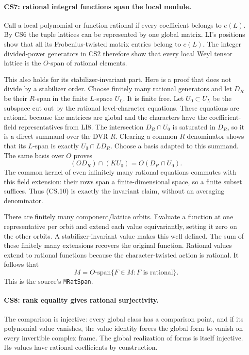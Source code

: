 \paragraph{CS7: rational integral functions span the local module.}
Call a local polynomial or function rational if every coefficient
belongs to $e(L)$. By CS6 the tuple lattices can be represented by one
global matrix. LI's positions show that all its Frobenius-twisted
matrix entries belong to $e(L)$. The integer divided-power generators
in CS2 therefore show that every local Weyl tensor lattice is the
$O$-span of rational elements.

This also holds for its stabilizer-invariant part. Here is a proof
that does not divide by a stabilizer order. Choose finitely many
rational generators and let $D_R$ be their $R$-span in the finite
$L$-space $U_L$. It is finite free. Let $U_0\subset U_L$ be the
subspace cut out by the rational level-character equations. These
equations are rational because the matrices are global and the
characters have the coefficient-field representatives from LI8.
The intersection $D_R\cap U_0$ is saturated in $D_R$, so it is a
direct summand over the DVR $R$. Clearing a common $R$-denominator
shows that its $L$-span is exactly $U_0\cap LD_R$. Choose a basis
adapted to this summand. The same basis over $O$ proves
\[
 (O D_R)\cap(K U_0)=O(D_R\cap U_0).                    \tag{CS.10}
\]
The common kernel of even infinitely many rational equations commutes
with this field extension: their rows span a finite-dimensional space,
so a finite subset suffices. Thus (CS.10) is exactly the invariant
claim, without an averaging denominator.

There are finitely many component/lattice orbits. Evaluate a function
at one representative per orbit and extend each value equivariantly,
setting it zero on the other orbits. A stabilizer-invariant value makes
this well defined. The sum of these finitely many extensions recovers
the original function. Rational values extend to rational functions
because the character-twisted action is rational. It follows that
\[
 M=O\text{-span}\{F\in M:F\text{ is rational}\}.        \tag{CS.11}
\]
This is the source's \texttt{MRatSpan}.

\paragraph{CS8: rank equality gives rational surjectivity.}
The comparison is injective: every global class has a comparison point,
and if its polynomial value vanishes, the value identity forces the
global form to vanish on every invertible complex frame. The global
realization of forms is itself injective. Its values have rational
coefficients by construction.

